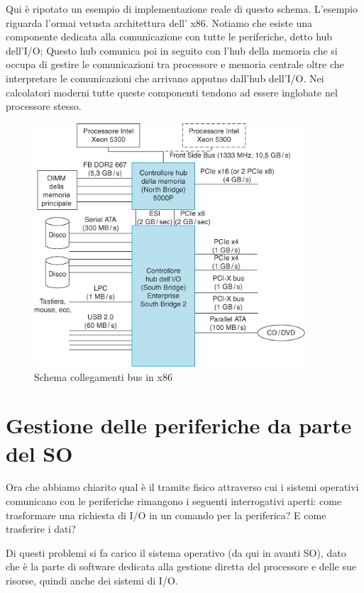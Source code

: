 \documentclass[class=book, crop=false, oneside]{standalone}
\begin{document}
Qui è ripotato un esempio di implementazione reale di questo schema. L'esempio riguarda l'ormai vetusta architettura dell' x86.
Notiamo che esiste una componente dedicata alla comunicazione con tutte le periferiche, detto hub dell'I/O; Questo hub comunica poi in seguito con l'hub della memoria che si occupa di gestire le comunicazioni tra processore e memoria centrale oltre che interpretare le comunicazioni che arrivano apputno dall'hub dell'I/O.
Nei calcolatori moderni tutte queste componenti tendono ad essere inglobate nel processore stesso.
\begin{figure}[!h]
	\centering
	\includegraphics[width=0.9\textwidth,keepaspectratio]{esempio-x86}
	\caption{Schema collegamenti bus in x86}
\end{figure}

\section{Gestione delle periferiche da parte del SO}
Ora che abbiamo chiarito qual è il tramite fisico attraverso cui i sistemi operativi comunicano con le periferiche rimangono i seguenti interrogativi aperti: come trasformare una richiesta di I/O in un comando per la periferica? E come trasferire i dati?

Di questi problemi si fa carico il sistema operativo (da qui in avanti SO), dato che è la parte di software dedicata alla gestione diretta del processore e delle sue risorse, quindi anche dei sistemi di I/O.
\end{document}
